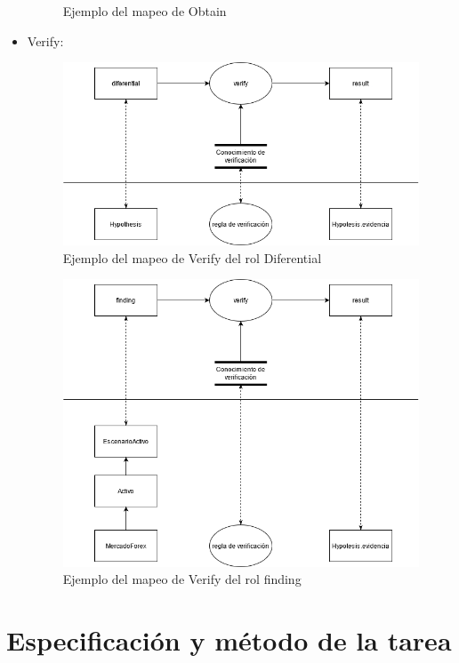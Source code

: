 \begin{itemize}
\begin{figure}[H]
    \caption{\label{fig:Obtain}Ejemplo del mapeo de Obtain}
  \end{figure}
  \item Verify:  
  \begin{figure}[H]
    \centering
    \includegraphics[scale=0.50]{imagenes/verify11.png}
    \caption{\label{fig:Verify}Ejemplo del mapeo de Verify del rol Diferential}
  \end{figure}
  \begin{figure}[H]
    \centering
    \includegraphics[scale=0.50]{imagenes/verify12.png}
    \caption{\label{fig:verify2}Ejemplo del mapeo de Verify del rol finding}
  \end{figure}
\end{itemize}

\section{Especificación y método de la tarea}

